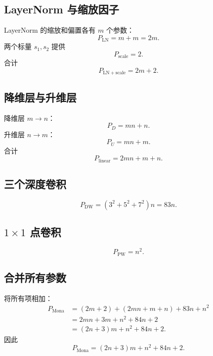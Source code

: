 \documentclass[UTF8,12pt,a4paper,fontset=none]{ctexart}
\begin{document}
\subsection{LayerNorm 与缩放因子}

LayerNorm 的缩放和偏置各有 $m$ 个参数：
\begin{equation}
 P_{\mathrm{LN}}=m+m=2m.
\end{equation}
两个标量 $s_1,s_2$ 提供
\begin{equation}
 P_{\mathrm{scale}}=2.
\end{equation}
合计
\begin{equation}
 P_{\mathrm{LN+scale}}=2m+2.
\end{equation}

\subsection{降维层与升维层}

降维层 $m\to n$：
\begin{equation}
 P_D=mn+n.
\end{equation}
升维层 $n\to m$：
\begin{equation}
 P_U=mn+m.
\end{equation}
合计
\begin{equation}
 P_{\mathrm{linear}}
 =2mn+m+n.
\end{equation}

\subsection{三个深度卷积}
\begin{equation}
 P_{\mathrm{DW}}=(3^2+5^2+7^2)n=83n.
\end{equation}

\subsection{\texorpdfstring{$1\times1$}{1x1} 点卷积}
\begin{equation}
 P_{\mathrm{PW}}=n^2.
\end{equation}

\subsection{合并所有参数}

将所有项相加：
\begin{align}
 P_{\mathrm{Mona}}
 &=(2m+2)+(2mn+m+n)+83n+n^2\\
 &=2mn+3m+n^2+84n+2\\
 &=(2n+3)m+n^2+84n+2.
 \tag{6}
\end{align}
因此
\begin{equation}
 \boxed{P_{\mathrm{Mona}}=(2n+3)m+n^2+84n+2}.
\end{equation}
\end{document}
